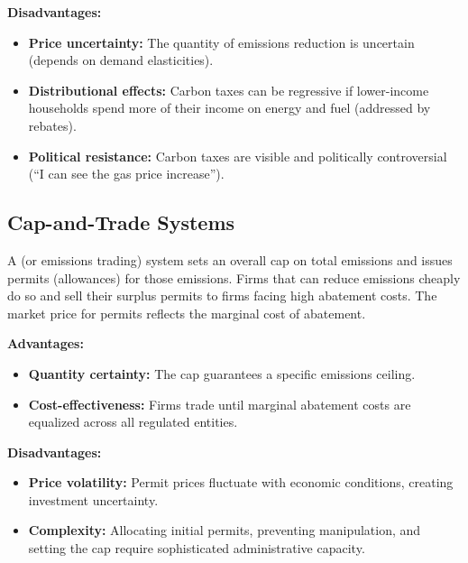 \textbf{Disadvantages:}
\begin{itemize}
  \item \textbf{Price uncertainty:} The quantity of emissions reduction is uncertain (depends on demand elasticities).
  \item \textbf{Distributional effects:} Carbon taxes can be regressive if lower-income households spend more of their income on energy and fuel (addressed by rebates).
  \item \textbf{Political resistance:} Carbon taxes are visible and politically controversial (``I can see the gas price increase'').
\end{itemize}

\subsection{Cap-and-Trade Systems}

A  (or emissions trading) system sets an overall cap on total emissions and issues permits (allowances) for those emissions. Firms that can reduce emissions cheaply do so and sell their surplus permits to firms facing high abatement costs. The market price for permits reflects the marginal cost of abatement.

\textbf{Advantages:}
\begin{itemize}
  \item \textbf{Quantity certainty:} The cap guarantees a specific emissions ceiling.
  \item \textbf{Cost-effectiveness:} Firms trade until marginal abatement costs are equalized across all regulated entities.
\end{itemize}

\textbf{Disadvantages:}
\begin{itemize}
  \item \textbf{Price volatility:} Permit prices fluctuate with economic conditions, creating investment uncertainty.
  \item \textbf{Complexity:} Allocating initial permits, preventing manipulation, and setting the cap require sophisticated administrative capacity.
\end{itemize}

